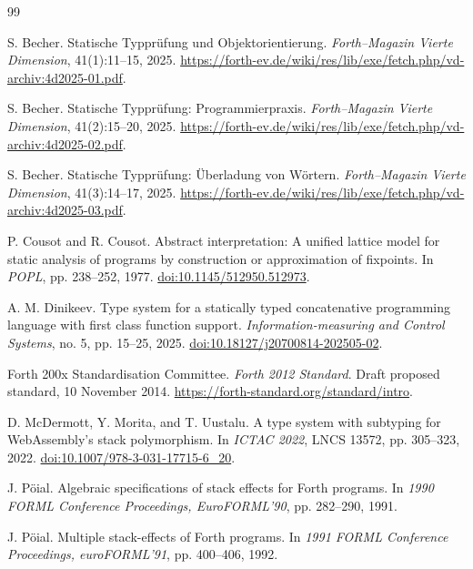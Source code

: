 \documentclass[11pt,a4paper]{article}
\begin{document}
\begin{thebibliography}{99}
\small
\raggedright

S. Becher.
\newblock Statische Typpr\"ufung und Objektorientierung.
\newblock \emph{Forth--Magazin Vierte Dimension}, 41(1):11--15, 2025.
\newblock \url{https://forth-ev.de/wiki/res/lib/exe/fetch.php/vd-archiv:4d2025-01.pdf}.

S. Becher.
\newblock Statische Typpr\"ufung: Programmierpraxis.
\newblock \emph{Forth--Magazin Vierte Dimension}, 41(2):15--20, 2025.
\newblock \url{https://forth-ev.de/wiki/res/lib/exe/fetch.php/vd-archiv:4d2025-02.pdf}.

S. Becher.
\newblock Statische Typpr\"ufung: \"Uberladung von W\"ortern.
\newblock \emph{Forth--Magazin Vierte Dimension}, 41(3):14--17, 2025.
\newblock \url{https://forth-ev.de/wiki/res/lib/exe/fetch.php/vd-archiv:4d2025-03.pdf}.

P. Cousot and R. Cousot.
\newblock Abstract interpretation: A unified lattice model for static analysis
of programs by construction or approximation of fixpoints.
\newblock In \emph{POPL}, pp. 238--252, 1977.
\newblock \href{https://doi.org/10.1145/512950.512973}{doi:10.1145/512950.512973}.

A. M. Dinikeev.
\newblock Type system for a statically typed concatenative programming
language with first class function support.
\newblock \emph{Information-measuring and Control Systems}, no. 5,
pp. 15--25, 2025.
\newblock \href{https://doi.org/10.18127/j20700814-202505-02}{doi:10.18127/j20700814-202505-02}.

Forth 200x Standardisation Committee.
\newblock \emph{Forth 2012 Standard}.
\newblock Draft proposed standard, 10 November 2014.
\newblock \url{https://forth-standard.org/standard/intro}.

D. McDermott, Y. Morita, and T. Uustalu.
\newblock A type system with subtyping for WebAssembly's stack polymorphism.
\newblock In \emph{ICTAC 2022}, LNCS 13572, pp. 305--323, 2022.
\newblock \href{https://doi.org/10.1007/978-3-031-17715-6_20}{doi:10.1007/978-3-031-17715-6\_20}.

J. Pöial.
\newblock Algebraic specifications of stack effects for Forth programs.
\newblock In \emph{1990 FORML Conference Proceedings, EuroFORML'90},
pp. 282--290, 1991.

J. Pöial.
\newblock Multiple stack-effects of Forth programs.
\newblock In \emph{1991 FORML Conference Proceedings, euroFORML'91},
pp. 400--406, 1992.


\end{thebibliography}
\end{document}
